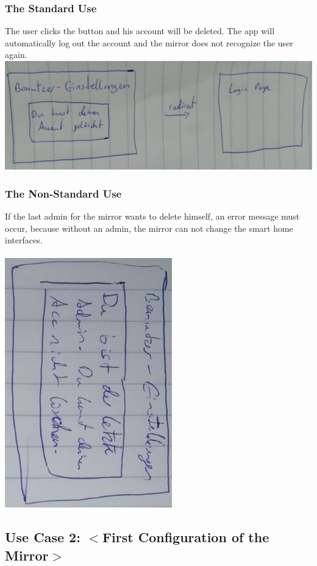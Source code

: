 \documentclass[12pt]{article}
\theoremstyle{definition}
\begin{document}
\subsubsection{The Standard Use}
The user clicks the button and his account will be deleted. The app will automatically log out the account and the mirror does not recognize the user again.
 \includegraphics[angle=90, scale=.3]{UseCase/UIDELETEUSER2.png}\\

\subsubsection{The Non-Standard Use}
If the last admin for the mirror wants to delete himself, an error message must occur, because without an admin, the mirror can not change the smart home interfaces.\\\\
 \includegraphics[angle=90, scale=.5]{UseCase/LetzterAdminWillAccountLoschen.jpeg}\\

\subsection{Use Case 2: $<$First Configuration of the Mirror$>$}
\end{document}
